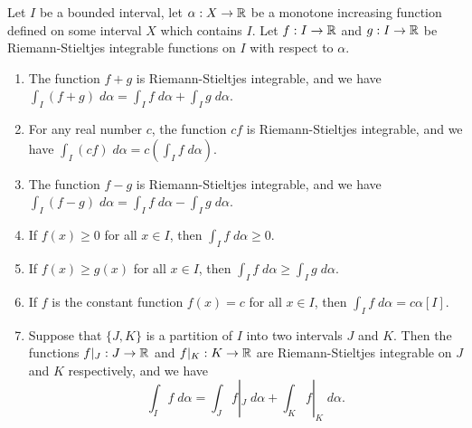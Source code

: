 \begin{ac}\label{ac:11.8.11}
  Let \(I\) be a bounded interval, let \(\alpha : X \to \mathbb{R}\) be a monotone increasing function defined on some interval \(X\) which contains \(I\).
  Let \(f : I \to \mathbb{R}\) and \(g : I \to \mathbb{R}\) be Riemann-Stieltjes integrable functions on \(I\) with respect to \(\alpha\).
  \begin{enumerate}
    \item The function \(f + g\) is Riemann-Stieltjes integrable, and we have \(\int_I (f + g) \; d \alpha = \int_I f \; d \alpha + \int_I g \; d \alpha\).
    \item For any real number \(c\), the function \(cf\) is Riemann-Stieltjes integrable, and we have \(\int_I (cf) \; d \alpha = c(\int_I f \; d \alpha)\).
    \item The function \(f - g\) is Riemann-Stieltjes integrable, and we have \(\int_I (f - g) \; d \alpha = \int_I f \; d \alpha - \int_I g \; d \alpha\).
    \item If \(f(x) \geq 0\) for all \(x \in I\), then \(\int_I f \; d \alpha \geq 0\).
    \item If \(f(x) \geq g(x)\) for all \(x \in I\), then \(\int_I f \; d \alpha \geq \int_I g \; d \alpha\).
    \item If \(f\) is the constant function \(f(x) = c\) for all \(x \in I\), then \(\int_I f \; d \alpha = c \alpha[I]\).
    \item Suppose that \(\{J, K\}\) is a partition of \(I\) into two intervals \(J\) and \(K\).
          Then the functions \(f|_J : J \to \mathbb{R}\) and \(f|_K : K \to \mathbb{R}\) are Riemann-Stieltjes integrable on \(J\) and \(K\) respectively, and we have
          \[
            \int_I f \; d \alpha = \int_J f|_J \; d \alpha + \int_K f|_K \; d \alpha.
          \]
  \end{enumerate}
\end{ac}

